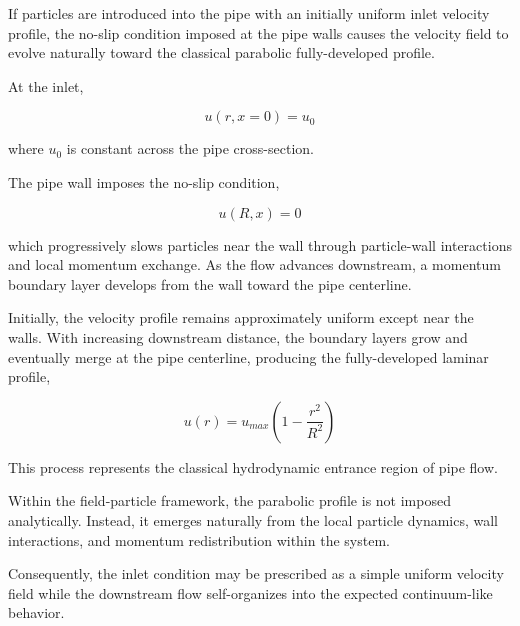 \documentclass[11pt]{article}
\begin{document}
If particles are introduced into the pipe with an initially uniform inlet velocity profile, the no-slip condition imposed at the pipe walls causes the velocity field to evolve naturally toward the classical parabolic fully-developed profile.

At the inlet,

\[
u(r,x=0)=u_0
\]

where $u_0$ is constant across the pipe cross-section.

The pipe wall imposes the no-slip condition,

\[
u(R,x)=0
\]

which progressively slows particles near the wall through particle-wall interactions and local momentum exchange. As the flow advances downstream, a momentum boundary layer develops from the wall toward the pipe centerline.

Initially, the velocity profile remains approximately uniform except near the walls. With increasing downstream distance, the boundary layers grow and eventually merge at the pipe centerline, producing the fully-developed laminar profile,

\[
u(r)
=
u_{max}
\left(
1-\frac{r^2}{R^2}
\right)
\]

This process represents the classical hydrodynamic entrance region of pipe flow.

Within the field-particle framework, the parabolic profile is not imposed analytically. Instead, it emerges naturally from the local particle dynamics, wall interactions, and momentum redistribution within the system.

Consequently, the inlet condition may be prescribed as a simple uniform velocity field while the downstream flow self-organizes into the expected continuum-like behavior.
\end{document}
